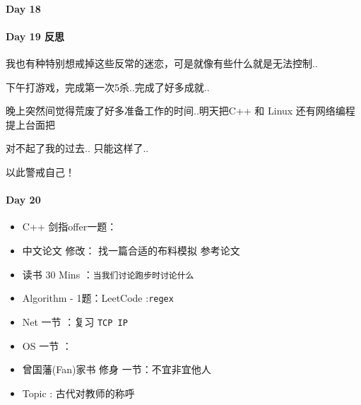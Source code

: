 \documentclass[UTF8,a4paper,8pt]{ctexart}
\begin{document}
 	 \paragraph{Day 18      \quad     }
 	 \paragraph{Day 19  反思   \quad     }
	 	 我也有种特别想戒掉这些反常的迷恋，可是就像有些什么就是无法控制..
	 	 
	 	 下午打游戏，完成第一次5杀..完成了好多成就..
	 	 
	 	 晚上突然间觉得荒废了好多准备工作的时间..明天把C++ 和 Linux 还有网络编程提上台面把
	 	 
	 	 对不起了我的过去.. 只能这样了..
	 	 
	 	 以此警戒自己！
 	 \paragraph{Day 20      \quad     }
 	 
	 	  \begin{itemize}[itemindent = 1em]
	 	  	\renewcommand\labelitemi{\makebox[0pt][l]{$\square$}\hspace{1em}} 
	 	  	\renewcommand\labelitemi{\makebox[0pt][l]{$\square$}\raisebox{.15ex}{\hspace{0.1em}$\checkmark$}}	 	
	 	  	\item   C++ 剑指offer一题：\verb||
	 	  	\item   中文论文 修改： 找一篇合适的布料模拟 参考论文
	 	  	
	 	  	\item   读书  30 Mins	：\verb|当我们讨论跑步时讨论什么|
	 	  	\item   Algorithm - 1题：LeetCode :\verb|regex|	
	 	  	\item   Net 一节 ：复习 \verb|TCP IP|	
	 	  	\renewcommand\labelitemi{\makebox[0pt][l]{$\square$}\hspace{1em}} 
	 	  	
	 	  	\item   OS  一节 ：
	 	  	
	 	  	\renewcommand\labelitemi{\makebox[0pt][l]{$\square$}\raisebox{.15ex}{\hspace{0.1em}$\checkmark$}}
	 	  	\item   曾国藩(Fan)家书 修身 一节：不宜非宜他人
	 	  	\item   Topic : 古代对教师的称呼
	 	  \end{itemize}
\end{document}
